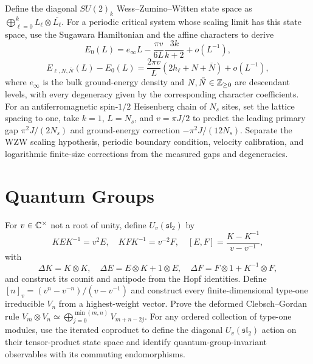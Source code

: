 \begin{exercise}
Define the diagonal $SU(2)_k$ Wess--Zumino--Witten state space as
$\bigoplus_{\ell=0}^kL_\ell\otimes\overline{L_\ell}$.  For a periodic
critical system whose scaling limit has this state space, use the Sugawara
Hamiltonian and the affine characters to derive
\[
 E_0(L)=e_\infty L-\frac{\pi v}{6L}\frac{3k}{k+2}+o(L^{-1}),
\]
\[
 E_{\ell,N,\bar N}(L)-E_0(L)
 =\frac{2\pi v}{L}
 \left(2h_\ell+N+\bar N\right)+o(L^{-1}),
\]
where $e_\infty$ is the bulk ground-energy density and
$N,\bar N\in\mathbb Z_{\geq0}$ are
descendant levels, with every degeneracy given by the corresponding character
coefficients.  For an antiferromagnetic spin-$1/2$ Heisenberg chain of
$N_s$ sites, set the lattice spacing to one, take $k=1$, $L=N_s$, and
$v=\pi J/2$ to predict the leading primary gap $\pi^2J/(2N_s)$ and
ground-energy correction $-\pi^2J/(12N_s)$.  Separate the WZW scaling
hypothesis, periodic boundary condition, velocity calibration, and
logarithmic finite-size corrections from the measured gaps and degeneracies.
\end{exercise}

\section{Quantum Groups}

\begin{exercise}
For $v\in\mathbb C^\times$ not a root of unity, define
$U_v(\mathfrak{sl}_2)$ by
\[
 KEK^{-1}=v^2E,\quad KFK^{-1}=v^{-2}F,\quad
 [E,F]=\frac{K-K^{-1}}{v-v^{-1}},
\]
with
\[
 \Delta K=K\otimes K,\quad
 \Delta E=E\otimes K+1\otimes E,\quad
 \Delta F=F\otimes1+K^{-1}\otimes F,
\]
and construct its counit and antipode from the Hopf identities.  Define
$[n]_v=(v^n-v^{-n})/(v-v^{-1})$ and construct every finite-dimensional
type-one irreducible $V_n$ from a highest-weight vector.  Prove the deformed
Clebsch--Gordan rule $V_m\otimes V_n\simeq
\bigoplus_{j=0}^{\min(m,n)}V_{m+n-2j}$.  For any ordered collection of
type-one modules, use the iterated coproduct to define the diagonal
$U_v(\mathfrak{sl}_2)$ action on their tensor-product state space and identify
quantum-group-invariant observables with its commuting endomorphisms.
\end{exercise}

